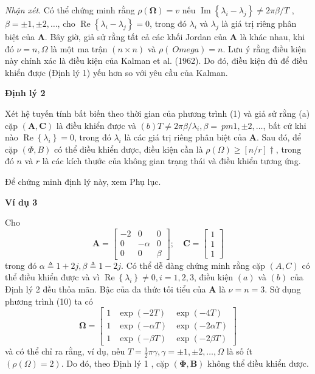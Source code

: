 \documentclass[12pt,a4paper]{article}
\begin{document}
\textit{Nhận xét}. Có thể chứng minh rằng $\rho(\boldsymbol{\Omega})=v$ nếu $\operatorname{Im}\left\{\lambda_i-\lambda_j\right\} \neq 2 \pi \beta / T$ , $\beta= \pm 1, \pm 2, \ldots$, cho $\operatorname{Re}\left\{\lambda_i-\lambda_j\right\}=0$, trong đó $\lambda_i$ và $\lambda_j $ là giá trị riêng phân biệt của $\boldsymbol{A}$.
Bây giờ, giả sử rằng tất cả các khối Jordan của $\mathbf{A}$ là khác nhau, khi đó $\nu=n, \Omega$ là một ma trận $(n \times n)$ và $\rho(\ Omega)=n$. Lưu ý rằng điều kiện này chính xác là điều kiện của Kalman et al. (1962). Do đó, điều kiện đủ để điều khiển được (Định lý 1) yếu hơn so với yêu cầu của Kalman.

\textbf{Định lý 2}

Xét hệ tuyến tính bất biến theo thời gian của phương trình (1) và giả sử rằng (a) cặp $(\mathbf{A}, \mathbf{C})$ là điều khiển được và $(b) T \neq 2 \pi \beta / \lambda_i, \beta= \ pm 1, \pm 2, \ldots$, bất cứ khi nào $\operatorname{Re}\left\{\lambda_i\right\}=0$, trong đó $\lambda_i$ là các giá trị riêng phân biệt của $\mathbf{A }$. Sau đó, để cặp $(\Phi, B)$ có thể điều khiển được, điều kiện cần là $\rho(\Omega) \geqslant[n / r] \dagger$, trong đó $n$ và $r$ là các kích thước của không gian trạng thái và điều khiển tương ứng.

Để chứng minh định lý này, xem Phụ lục.

\textbf{Ví dụ 3}

Cho
$$
\mathbf{A}=\left[\begin{array}{rrr}
	-2 & 0 & 0 \\
	0 & -\alpha & 0 \\
	0 & 0 & \beta
\end{array}\right] ; \quad \mathbf{C}=\left[\begin{array}{l}
	1 \\
	1 \\
	1
\end{array}\right]
$$
trong đó $\alpha \triangleq 1+2 j, \beta \triangleq 1-2 j$. Có thể dễ dàng chứng minh rằng cặp $(A, C)$ có thể điều khiển được và vì $\operatorname{Re}\left\{\lambda_i\right\} \neq 0, i=1,2,3$, điều kiện $(a )$ và $(b)$ của Định lý 2 đều thỏa mãn. Bậc của đa thức tối tiểu của $\mathbf{A}$ là $\nu=n=3$. Sử dụng phương trình (10) ta có
$$
\boldsymbol{\Omega}=\left[\begin{array}{lll}
	1 & \exp (-2 T) & \exp (-4 T) \\
	1 & \exp (-\alpha T) & \exp (-2 \alpha T) \\
	1 & \exp (-\beta T) & \exp (-2 \beta T)
\end{array}\right]
$$
và có thể chỉ ra rằng, ví dụ, nếu $T=\frac{1}{2} \pi \gamma, \gamma= \pm 1, \pm 2, \ldots, \Omega$ là số ít $(\rho (\Omega)=2)$. Do đó, theo Định lý 1 , cặp $(\boldsymbol{\Phi}, \mathbf{B})$ không thể điều khiển được. 
\end{document}

